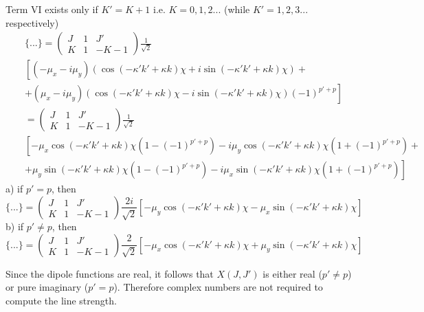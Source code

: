 Term VI exists only if $K' = K +1$  i.e. $K = 0, 1, 2...$ (while $K' = 1, 2, 3...$ respectively)
\begin{eqnarray} \nonumber
&& \{...\} = 
\left( \begin{array}{ccc} 
 J &  1 &  J' \\
 K &  1 & -K-1  \end{array} \right)
\frac{1}{\sqrt{2}} \\ \nonumber
&& \left[ ( -\mu_x - i \mu_y) 
\left( \cos ( -\kappa' k' + \kappa k) \chi + i \sin ( -\kappa' k' + \kappa k) \chi \right) + \right. \\ 
&& \left.
+ ( \mu_x - i \mu_y)
\left( \cos ( -\kappa' k' + \kappa k) \chi - i \sin ( -\kappa' k' + \kappa k) \chi \right) (-1)^{p'+p}
\right] \\ \nonumber
&&  = 
\left( \begin{array}{ccc} 
 J &  1 &  J' \\
 K &  1 & -K-1  \end{array} \right)
\frac{1}{\sqrt{2}} \\ \nonumber
&& \left[ 
-  \mu_x \cos ( -\kappa' k' + \kappa k) \chi \left( 1- (-1)^{p'+p} \right)
-i \mu_y \cos ( -\kappa' k' + \kappa k) \chi \left( 1+ (-1)^{p'+p} \right) + \right. \\ 
&& \left.
+  \mu_y \sin ( -\kappa' k' + \kappa k) \chi \left( 1- (-1)^{p'+p} \right)
-i \mu_x \sin ( -\kappa' k' + \kappa k) \chi \left( 1+ (-1)^{p'+p} \right) \right]
\end{eqnarray}
a) if $p' = p$, then 
\begin{equation}
\{...\} = 
\left( \begin{array}{ccc} 
 J &  1 &  J' \\
 K &  1 & -K-1  \end{array} \right)
\frac{2i}{\sqrt{2}} \left[
- \mu_y \cos ( -\kappa' k' + \kappa k) \chi -  \mu_x \sin ( -\kappa' k' + \kappa k) \chi \right]
\end{equation}
b) if $p' \ne p$, then 
\begin{equation}
\{...\} = 
\left( \begin{array}{ccc} 
 J &  1 &  J' \\
 K &  1 & -K-1  \end{array} \right)
\frac{2}{\sqrt{2}} \left[
- \mu_x \cos ( -\kappa' k' + \kappa k) \chi +  \mu_y \sin ( -\kappa' k' + \kappa k) \chi \right]
\end{equation}

Since the dipole functions are real, it follows that $X(J,J')$ is either real ($p' \ne p$) 
or pure imaginary ($p' = p$). Therefore complex numbers are not required to compute
the line strength.
